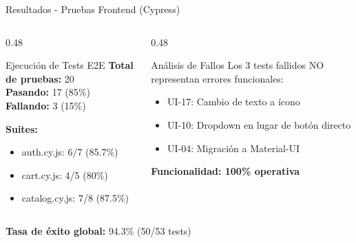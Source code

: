 \documentclass[aspectratio=169]{beamer}
\begin{document}
\begin{frame}{Resultados - Pruebas Frontend (Cypress)}
\begin{columns}[T]
\begin{column}{0.48\textwidth}
\begin{block}{Ejecución de Tests E2E}
\textbf{Total de pruebas:} 20 \\
\textbf{Pasando:} \textcolor{successgreen}{17 (85\%)} \\
\textbf{Fallando:} \textcolor{warningorange}{3 (15\%)}
\end{block}

\vspace{0.3cm}

\textbf{Suites:}
\begin{itemize}
    \item auth.cy.js: 6/7 (85.7\%)
    \item cart.cy.js: 4/5 (80\%)
    \item catalog.cy.js: 7/8 (87.5\%)
\end{itemize}
\end{column}

\begin{column}{0.48\textwidth}
\begin{block}{Análisis de Fallos}
Los 3 tests fallidos NO representan errores funcionales:
\end{block}

\begin{itemize}
    \item UI-17: Cambio de texto a ícono
    \item UI-10: Dropdown en lugar de botón directo
    \item UI-04: Migración a Material-UI
\end{itemize}

\vspace{0.3cm}

\textcolor{successgreen}{\textbf{Funcionalidad: 100\% operativa}}
\end{column}
\end{columns}

\vspace{0.3cm}

\begin{center}
\textbf{Tasa de éxito global:} \textcolor{successgreen}{94.3\%} (50/53 tests)
\end{center}
\end{frame}

\end{document}
